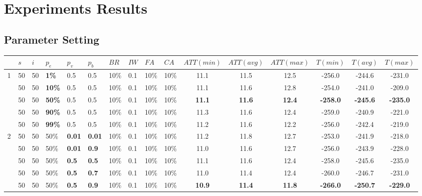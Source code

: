 \chapter{Experiments Results}
\label{appendixC}

\section{Parameter Setting}

\begin{sidewaystable}
    \centering
	\begin{tabular}{|l|l|l|l|l|l|l|l|l|l||c|c|c|c|c|c|}
 	\hline
 	~ & $s$ & $i$ & $p_{e}$ & $p_{v}$ & $p_{b}$ & $BR$ &$IW$ & $FA$ & $CA$ &  $ATT(min)$ & $ATT(avg)$ & $ATT(max)$ & $T(min)$ & $T(avg)$ & $T(max)$\\
 	\hline
    1 & 50 & 50 & \textbf{1\%} & 0.5 & 0.5 & 10\% & 0.1 & 10\% & 10\% & 11.1 & 11.5 & 12.5 & -256.0 &-244.6 & -231.0  \\
    ~ & 50 & 50 & \textbf{10\%} & 0.5 & 0.5 & 10\% & 0.1 & 10\% & 10\% & 11.1 & 11.6 & 12.8 & -254.0 & -241.0 & -209.0 \\
    ~ & 50 & 50 & \textbf{50\%} & 0.5 & 0.5 & 10\% & 0.1 & 10\% & 10\% & \textbf{11.1} & \textbf{11.6} & \textbf{12.4} & \textbf{-258.0} & \textbf{-245.6} & \textbf{-235.0}\\
    ~ & 50 & 50 & \textbf{90\%} & 0.5 & 0.5 & 10\% & 0.1 & 10\% & 10\% &  11.3 & 11.6 & 12.4 & -259.0 & -240.9 & -221.0  \\
    ~ & 50 & 50 & \textbf{99\%} & 0.5 & 0.5 & 10\% & 0.1 & 10\% & 10\% &  11.2 & 11.6 & 12.2 & -256.0 & -242.4 & -219.0  \\
    \hline
    2 & 50 & 50 & 50\% & \textbf{0.01} & \textbf{0.01} & 10\% & 0.1 & 10\% & 10\% & 11.2 & 11.8 & 12.7 & -253.0 & -241.9 & -218.0  \\
    ~ & 50 & 50 & 50\% & \textbf{0.01} & \textbf{0.9} & 10\% & 0.1 & 10\% & 10\% &  11.0 & 11.6 & 12.7 & -256.0 & -243.9 & -228.0  \\
    ~ & 50 & 50 & 50\% & \textbf{0.5} & \textbf{0.5} & 10\% & 0.1 & 10\%& 10\% & 11.1 & 11.6 & 12.4 & -258.0 & -245.6 & -235.0 \\
    ~ & 50 & 50 & 50\% & \textbf{0.5} & \textbf{0.7} & 10\% & 0.1 & 10\% & 10\% &  11.0 & 11.4 & 12.4 & -260.0 & -246.7 & -231.0 \\
    ~ & 50 & 50 & 50\% & \textbf{0.5} & \textbf{0.9} & 10\% & 0.1 & 10\% & 10\% &  \textbf{10.9} & \textbf{11.4} & \textbf{11.8} & \textbf{-266.0} & \textbf{-250.7} & \textbf{-229.0} \\

\end{tabular}
\end{sidewaystable}
